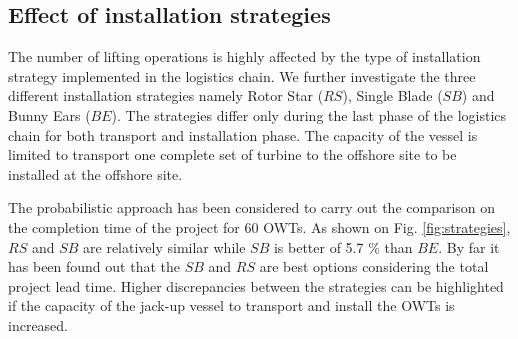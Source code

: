 \subsection{Effect of installation strategies}
The number of lifting operations is highly affected by the type of installation strategy implemented in the logistics chain. We further investigate the three different installation strategies namely Rotor Star ($RS$), Single Blade ($SB$) and Bunny Ears ($BE$). The strategies differ only during the last phase of the logistics chain for both transport and installation phase. The capacity of the vessel is limited to transport one complete set of turbine to the offshore site to be installed at the offshore site.

The probabilistic approach has been considered to carry out the comparison on the completion time of the project for 60 OWTs. As shown on Fig. \ref{fig:strategies}, $RS$ and $SB$ are relatively similar while $SB$ is better of 5.7 \% than $BE$. By far it has been found out that the $SB$ and $RS$ are best options considering the total project lead time. Higher discrepancies between the strategies can be highlighted if the capacity of the jack-up vessel to transport and install the OWTs is increased.%
